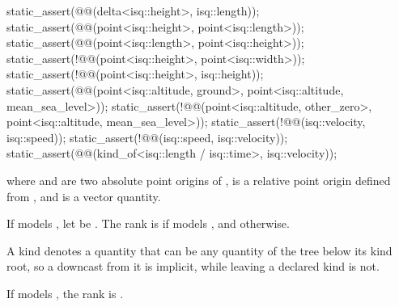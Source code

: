 \begin{example}
\begin{codeblock}
static_assert(@@(delta<isq::height>, isq::length));
static_assert(@@(point<isq::height>, point<isq::length>));
static_assert(@@(point<isq::length>, point<isq::height>));
static_assert(!@@(point<isq::height>, point<isq::width>));
static_assert(!@@(point<isq::height>, isq::height));
static_assert(@@(point<isq::altitude, ground>, point<isq::altitude, mean_sea_level>));
static_assert(!@@(point<isq::altitude, other_zero>, point<isq::altitude, mean_sea_level>));
static_assert(!@@(isq::velocity, isq::speed));
static_assert(!@@(isq::speed, isq::velocity));
static_assert(@@(kind_of<isq::length / isq::time>, isq::velocity));
\end{codeblock}
where  and  are two absolute point origins of ,
 is a relative point origin defined from ,
and  is a vector quantity.
\end{example}

\pnum
If  models ,
let  be .
The rank is 
if  models , and
 otherwise.
\begin{note}
A kind denotes a quantity that can be any quantity of the tree below its kind root,
so a downcast from it is implicit, while leaving a declared kind is not.
\end{note}

\pnum
If  models ,
the rank is .

